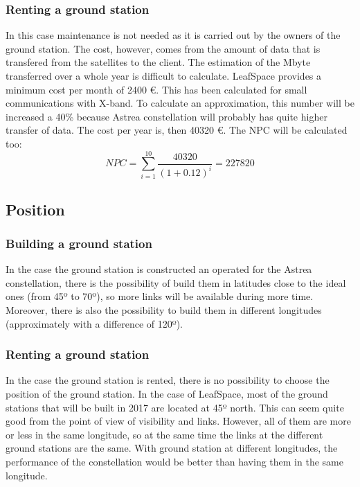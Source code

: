 \subsubsection{Renting a ground station}
In this case maintenance is not needed as it is carried out by the owners of the ground station. The cost, however, comes from the amount of data that is transfered from the satellites to the client. The estimation of the Mbyte transferred over a whole year is difficult to calculate. LeafSpace provides a minimum cost per month of 2400 \euro . This has been calculated for small communications  with X-band. To calculate an approximation, this number will be increased a 40\% because Astrea constellation will probably has quite higher transfer of data. The cost per year is, then 40320 \euro. The NPC will be calculated too: 
\begin{equation}
NPC=\sum_{i=1}^{10} \frac{40320}{(1+0.12)^i}=227820 
\end{equation}

\subsection{Position}

\subsubsection{Building a ground station}
In the case the ground station is constructed an operated for the Astrea constellation, there is the possibility of build them in latitudes close to the ideal ones (from 45º to 70º), so more links will be available during more time. Moreover, there is also the possibility to build them in different longitudes (approximately with a difference of 120º).

\subsubsection{Renting a ground station}
In the case the ground station is rented, there is no possibility to choose the position of the ground station. In the case of LeafSpace, most of the ground stations that will be built in 2017 are located at 45º north. This can seem quite good from the point of view of visibility and links. However, all of them are more or less in the same longitude, so at the same time the links at the different ground stations are the same. With ground station at different longitudes, the performance of the constellation would be better than having them in the same longitude.

